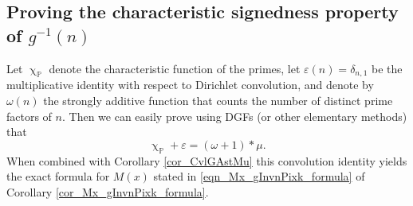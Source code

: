 \documentclass[11pt,reqno,a4letter]{article}
\numberwithin{figure}{section}
\numberwithin{table}{section}
\renewcommand{\chi}{\upchi}
\theoremstyle{plain}
\numberwithin{theorem}{section}
\theoremstyle{definition}
\begin{document}
\subsection{Proving the characteristic signedness property of $g^{-1}(n)$} 

Let $\chi_{\mathbb{P}}$ denote the characteristic function of the primes, let 
$\varepsilon(n) = \delta_{n,1}$ be the multiplicative identity with respect to Dirichlet convolution, 
and denote by $\omega(n)$ the strongly additive function that counts the number of 
distinct prime factors of $n$. Then we can easily prove using DGFs 
(or other elementary methods) that 
\begin{equation}
\label{eqn_AntiqueDivisorSumIdent} 
\chi_{\mathbb{P}} + \varepsilon = (\omega + 1) \ast \mu. 
\end{equation} 
When combined with Corollary \ref{cor_CvlGAstMu} 
this convolution identity yields the exact 
formula for $M(x)$ stated in \eqref{eqn_Mx_gInvnPixk_formula} of 
Corollary \ref{cor_Mx_gInvnPixk_formula}. 
\end{document}
